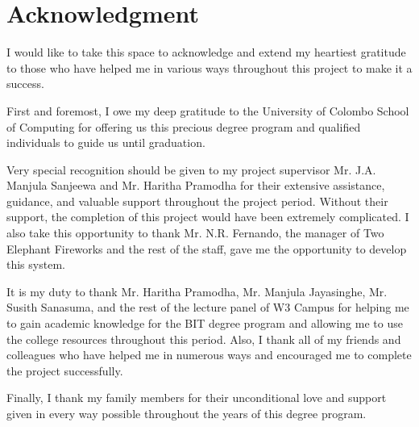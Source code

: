 \documentclass[12pt]{report}
\begin{document}

\newpage
\thispagestyle{plain}
\chapter*{\Huge Acknowledgment}
I would like to take this space to acknowledge and extend my heartiest gratitude to those who have helped me in various ways throughout this project to make it a success.

First and foremost, I owe my deep gratitude to the University of Colombo School of Computing for offering us this precious degree program and qualified individuals to guide us until graduation.

Very special recognition should be given to my project supervisor Mr. J.A. Manjula Sanjeewa and Mr. Haritha Pramodha for their extensive assistance, guidance, and valuable support throughout the project period. Without their support, the completion of this project would have been extremely complicated. I also take this opportunity to thank Mr. N.R. Fernando, the manager of Two Elephant Fireworks and the rest of the staff, gave me the opportunity to develop this system.

It is my duty to thank Mr. Haritha Pramodha, Mr. Manjula Jayasinghe, Mr. Susith Sanasuma, and the rest of the lecture panel of W3 Campus for helping me to gain academic knowledge for the BIT degree program and allowing me to use the college resources throughout this period. Also, I thank all of my friends and colleagues who have helped me in numerous ways and encouraged me to complete the project successfully.

Finally, I thank my family members for their unconditional love and support given in every way possible throughout the years of this degree program.


\newpage
{}
\begin{singlespacing}
	\tableofcontents
\end{singlespacing}
\setlength{\parskip}{1em}
\renewcommand{\baselinestretch}{2.0}


\newpage
{}
\begin{singlespacing}
	\listoffigures
\end{singlespacing}
\renewcommand{\baselinestretch}{2.0}
\end{document}
